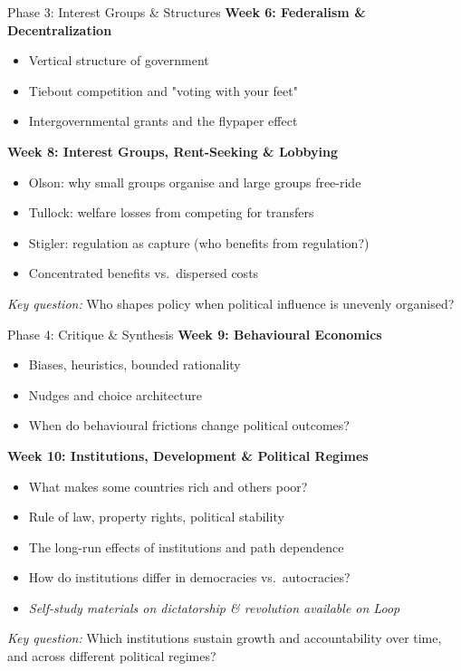 \documentclass[10pt]{beamer}
\begin{document}
\begin{frame}{Phase 3: Interest Groups \& Structures}
\textbf{Week 6: Federalism \& Decentralization}
\begin{itemize}
\item Vertical structure of government
\item Tiebout competition and "voting with your feet"
\item Intergovernmental grants and the flypaper effect
\end{itemize}


\textbf{Week 8: Interest Groups, Rent-Seeking \& Lobbying}
\begin{itemize}
\item Olson: why small groups organise and large groups free-ride
\item Tullock: welfare losses from competing for transfers
\item Stigler: regulation as capture (who benefits from regulation?)
\item Concentrated benefits vs.\ dispersed costs
\end{itemize}


\textit{Key question:} Who shapes policy when political influence is unevenly organised?
\end{frame}

\begin{frame}{Phase 4: Critique \& Synthesis}
\textbf{Week 9: Behavioural Economics}
\begin{itemize}
\item Biases, heuristics, bounded rationality
\item Nudges and choice architecture
\item When do behavioural frictions change political outcomes?
\end{itemize}


\textbf{Week 10: Institutions, Development \& Political Regimes}
\begin{itemize}
\item What makes some countries rich and others poor?
\item Rule of law, property rights, political stability
\item The long-run effects of institutions and path dependence
\item How do institutions differ in democracies vs.\ autocracies?
\item \textit{Self-study materials on dictatorship \& revolution available on Loop}
\end{itemize}


\textit{Key question:} Which institutions sustain growth and accountability over time, and across different political regimes?
\end{frame}
\end{document}
